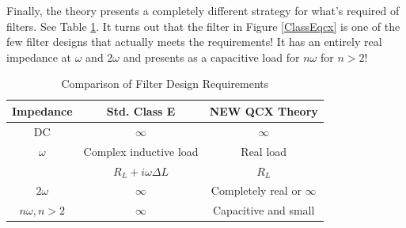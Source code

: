 \documentclass[10pt,letterpaper]{article}
\begin{document}
Finally, the theory presents a completely different strategy for what's required of filters. See Table \ref{filtercomparetable}. It turns out that the filter in Figure \ref{ClassEqcx} is one of the few filter designs that actually meets the requirements! It has an entirely real impedance at $\omega$ and $2\omega$ and presents as a capacitive load for $n\omega$ for $n>2$!

\begin{table}
\centering
\begin{tabular}{c|cc}
Impedance & Std. Class E & NEW QCX Theory \\
\hline
\hline 
DC & $\infty$ & $\infty$ \\ \hline
$\omega$ & Complex inductive load & Real load \\
& $R_L+i\omega \Delta L$ & $R_L$\\ \hline
$2\omega$ & $\infty$ & Completely real or $\infty$ \\ \hline
$n\omega,n>2$  & $\infty$ & Capacitive and small \\ \hline
\end{tabular}
\caption{Comparison of Filter Design Requirements}\label{filtercomparetable}
\end{table}
%
%
%
%
\end{document}
